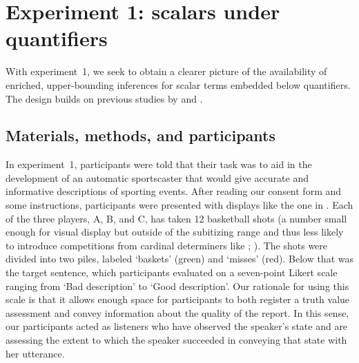 \documentclass[leqno]{article}
\begin{document}
\section{Experiment 1: scalars under quantifiers}\label{sec:exp1}

With experiment~1, we seek to obtain a clearer picture of the
availability of enriched, upper-bounding inferences for scalar terms
embedded below quantifiers. The design builds on previous studies by
\citet{Geurts:Pouscoulous:2009} and \citet{Chemla:Spector:2011}.


\subsection{Materials, methods, and participants}


In experiment~1, participants were told that their task was to aid in
the development of an automatic sportscaster that would give accurate
and informative descriptions of sporting events. After reading our
consent form and some instructions, participants were presented with
displays like the one in . Each of the three players,
A, B, and C, has taken 12 basketball shots (a number small enough for
visual display but outside of the subitizing range and thus less
likely to introduce competitions from cardinal determiners like
; \citealt{Degen:Tanenhaus:2014}). The shots were
divided into two piles, labeled `baskets' (green) and `misses'
(red). Below that was the target sentence, which participants
evaluated on a seven-point Likert scale ranging from `Bad description'
to `Good description'. Our rationale for using this scale is that it
allows enough space for participants to both register a truth value
assessment and convey information about the quality of the report. In
this sense, our participants acted as listeners who have observed the
speaker's state and are assessing the extent to which the speaker
succeeded in conveying that state with her utterance.
\end{document}
